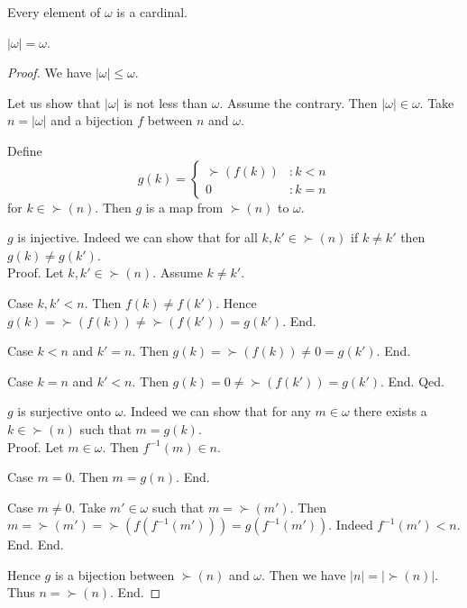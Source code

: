 \documentclass[../set-theory.tex]{subfiles}
\begin{document}
  \begin{forthel}
    \begin{corollary}
      Every element of $\omega$ is a cardinal.
    \end{corollary}
  \end{forthel}

  \begin{forthel}
    \begin{proposition}
      $|\omega| = \omega$.
    \end{proposition}
    \begin{proof}
      We have $|\omega| \leq \omega$.

      Let us show that $|\omega|$ is not less than $\omega$.
        Assume the contrary.
        Then $|\omega| \in \omega$.
        Take $n = |\omega|$ and a bijection $f$ between $n$ and $\omega$.

        Define \[ g(k) =
          \begin{cases}
            \succ(f(k)) & : k < n
            \\
            0           & : k = n
          \end{cases} \]
        for $k \in \succ(n)$.
        Then $g$ is a map from $\succ(n)$ to $\omega$.

        $g$ is injective.
        Indeed we can show that for all $k, k' \in \succ(n)$ if $k \neq k'$
        then $g(k) \neq g(k')$. \\
        Proof.
          Let $k, k' \in \succ(n)$.
          Assume $k \neq k'$.

          Case $k, k' < n$.
            Then $f(k) \neq f(k')$.
            Hence $g(k)
              = \succ(f(k))
              \neq \succ(f(k'))
              = g(k')$.
          End.

          Case $k < n$ and $k' = n$.
            Then $g(k)
              = \succ(f(k))
              \neq 0
              = g(k')$.
          End.

          Case $k = n$ and $k' < n$.
            Then $g(k)
              = 0
              \neq \succ(f(k'))
              = g(k')$.
          End.
        Qed.

        $g$ is surjective onto $\omega$.
        Indeed we can show that for any $m \in \omega$ there exists a
        $k \in \succ(n)$ such that $m = g(k)$. \\
        Proof.
          Let $m \in \omega$.
          Then $f^{-1}(m) \in n$.

          Case $m = 0$.
            Then $m = g(n)$.
          End.

          Case $m \neq 0$.
            Take $m' \in \omega$ such that $m = \succ(m')$.
            Then $m
              = \succ(m')
              = \succ(f(f^{-1}(m')))
              = g(f^{-1}(m'))$.
            Indeed $f^{-1}(m') < n$.
          End.
        End.

        Hence $g$ is a bijection between $\succ(n)$ and $\omega$.
        Then we have $|n| = |\succ(n)|$.
        Thus $n = \succ(n)$.
      End.
    \end{proof}
  \end{forthel}
\end{document}
